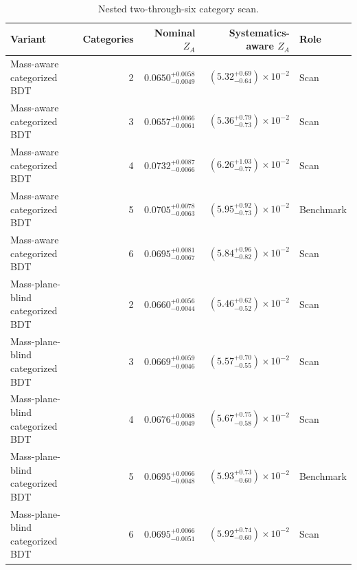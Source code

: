 \begin{table}[tb]
  \centering
  \footnotesize
  \caption{Nested two-through-six category scan.}
  \label{tab:c7w-count-scan}
  \begin{tabular}{lrrrl}
    \toprule
    Variant & Categories & Nominal $Z_A$ & Systematics-aware $Z_A$ & Role \\
    \midrule
    Mass-aware categorized BDT & 2 & $0.0650^{+0.0058}_{-0.0049}$ & $(5.32^{+0.69}_{-0.64})\times10^{-2}$ & Scan \\
    Mass-aware categorized BDT & 3 & $0.0657^{+0.0066}_{-0.0061}$ & $(5.36^{+0.79}_{-0.73})\times10^{-2}$ & Scan \\
    Mass-aware categorized BDT & 4 & $0.0732^{+0.0087}_{-0.0066}$ & $(6.26^{+1.03}_{-0.77})\times10^{-2}$ & Scan \\
    Mass-aware categorized BDT & 5 & $0.0705^{+0.0078}_{-0.0063}$ & $(5.95^{+0.92}_{-0.73})\times10^{-2}$ & Benchmark \\
    Mass-aware categorized BDT & 6 & $0.0695^{+0.0081}_{-0.0067}$ & $(5.84^{+0.96}_{-0.82})\times10^{-2}$ & Scan \\
    Mass-plane-blind categorized BDT & 2 & $0.0660^{+0.0056}_{-0.0044}$ & $(5.46^{+0.62}_{-0.52})\times10^{-2}$ & Scan \\
    Mass-plane-blind categorized BDT & 3 & $0.0669^{+0.0059}_{-0.0046}$ & $(5.57^{+0.70}_{-0.55})\times10^{-2}$ & Scan \\
    Mass-plane-blind categorized BDT & 4 & $0.0676^{+0.0068}_{-0.0049}$ & $(5.67^{+0.75}_{-0.58})\times10^{-2}$ & Scan \\
    Mass-plane-blind categorized BDT & 5 & $0.0695^{+0.0066}_{-0.0048}$ & $(5.93^{+0.73}_{-0.60})\times10^{-2}$ & Benchmark \\
    Mass-plane-blind categorized BDT & 6 & $0.0695^{+0.0066}_{-0.0051}$ & $(5.92^{+0.74}_{-0.60})\times10^{-2}$ & Scan \\
    \bottomrule
  \end{tabular}
\end{table}
